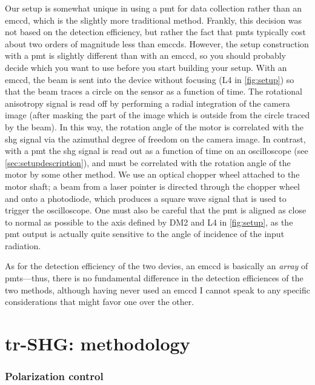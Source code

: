 Our setup is somewhat unique in using a \gls{pmt} for data collection rather than an \gls{emccd}, which is the slightly more traditional method.
Frankly, this decision was not based on the detection efficiency, but rather the fact that \glspl{pmt} typically cost about two orders of magnitude less than \glspl{emccd}.
However, the setup construction with a \gls{pmt} is slightly different than with an \gls{emccd}, so you should probably decide which you want to use before you start building your setup.
With an \gls{emccd}, the beam is sent into the device without focusing (L4 in \cref{fig:setup}) so that the beam traces a circle on the sensor as a function of time\cite{harter_high-speed_2015}.
The rotational anisotropy signal is read off by performing a radial integration of the camera image (after masking the part of the image which is outside from the circle traced by the beam).
In this way, the rotation angle of the motor is correlated with the \gls{shg} signal via the azimuthal degree of freedom on the camera image.
In contrast, with a \gls{pmt} the \gls{shg} signal is read out as a function of time on an oscilloscope (see \cref{sec:setupdescription}), and must be correlated with the rotation angle of the motor by some other method.
We use an optical chopper wheel attached to the motor shaft; a beam from a laser pointer is directed through the chopper wheel and onto a photodiode, which produces a square wave signal that is used to trigger the oscilloscope.
One must also be careful that the \gls{pmt} is aligned as close to normal as possible to the axis defined by DM2 and L4 in \cref{fig:setup}, as the \gls{pmt} output is actually quite sensitive to the angle of incidence of the input radiation.

As for the detection efficiency of the two devies, an \gls{emccd} is basically an \emph{array} of \glspl{pmt}---thus, there is no fundamental difference in the detection efficiences of the two methods, although having never used an \gls{emccd} I cannot speak to any specific considerations that might favor one over the other.

\section{tr-SHG: methodology}

\subsubsection{Polarization control}


